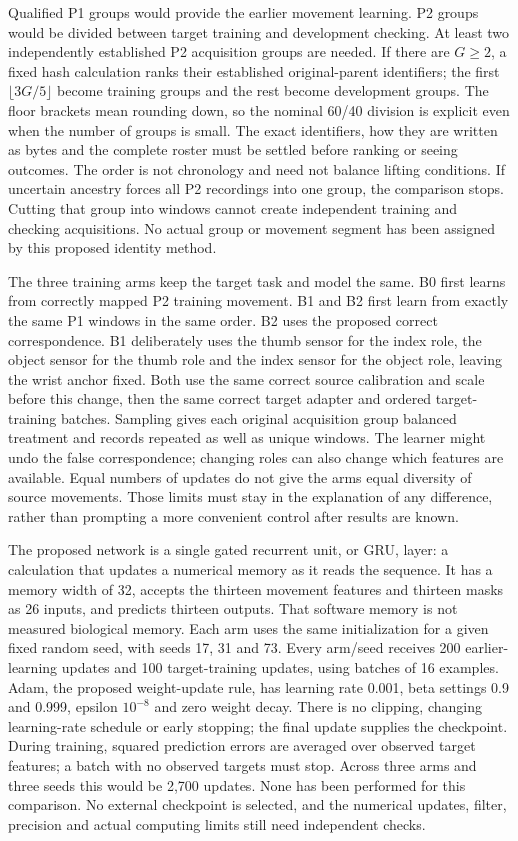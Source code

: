 Qualified P1 groups would provide the earlier movement learning. P2 groups would be divided between target training and development checking. At least two independently established P2 acquisition groups are needed. If there are $G\geq2$, a fixed hash calculation ranks their established original-parent identifiers; the first $\lfloor3G/5\rfloor$ become training groups and the rest become development groups. The floor brackets mean rounding down, so the nominal 60/40 division is explicit even when the number of groups is small. The exact identifiers, how they are written as bytes and the complete roster must be settled before ranking or seeing outcomes. The order is not chronology and need not balance lifting conditions. If uncertain ancestry forces all P2 recordings into one group, the comparison stops. Cutting that group into windows cannot create independent training and checking acquisitions. No actual group or movement segment has been assigned by this proposed identity method.

The three training arms keep the target task and model the same. B0 first learns from correctly mapped P2 training movement. B1 and B2 first learn from exactly the same P1 windows in the same order. B2 uses the proposed correct correspondence. B1 deliberately uses the thumb sensor for the index role, the object sensor for the thumb role and the index sensor for the object role, leaving the wrist anchor fixed. Both use the same correct source calibration and scale before this change, then the same correct target adapter and ordered target-training batches. Sampling gives each original acquisition group balanced treatment and records repeated as well as unique windows. The learner might undo the false correspondence; changing roles can also change which features are available. Equal numbers of updates do not give the arms equal diversity of source movements. Those limits must stay in the explanation of any difference, rather than prompting a more convenient control after results are known.

The proposed network is a single gated recurrent unit, or GRU, layer: a calculation that updates a numerical memory as it reads the sequence. It has a memory width of 32, accepts the thirteen movement features and thirteen masks as 26 inputs, and predicts thirteen outputs. That software memory is not measured biological memory. Each arm uses the same initialization for a given fixed random seed, with seeds 17, 31 and 73. Every arm/seed receives 200 earlier-learning updates and 100 target-training updates, using batches of 16 examples. Adam, the proposed weight-update rule, has learning rate 0.001, beta settings 0.9 and 0.999, epsilon $10^{-8}$ and zero weight decay. There is no clipping, changing learning-rate schedule or early stopping; the final update supplies the checkpoint. During training, squared prediction errors are averaged over observed target features; a batch with no observed targets must stop. Across three arms and three seeds this would be 2,700 updates. None has been performed for this comparison. No external checkpoint is selected, and the numerical updates, filter, precision and actual computing limits still need independent checks.

